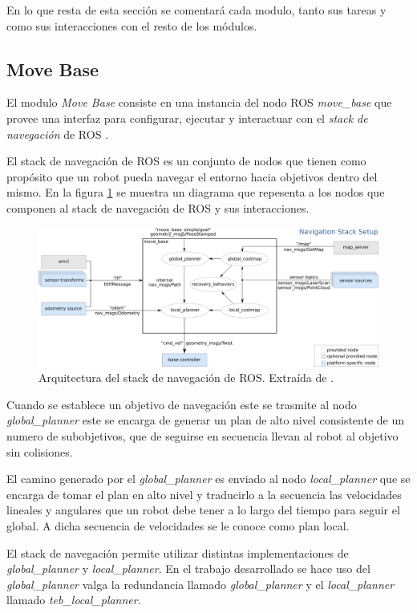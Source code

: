 En lo que resta de esta sección se comentará cada modulo, tanto sus tareas y como sus interacciones con el resto de los módulos.

\subsection{Move Base}
El modulo \emph{Move Base} consiste en una instancia del nodo ROS
\emph{move\_base} \cite{ROS-move_base} que provee una interfaz para configurar,
ejecutar y interactuar con el \emph{stack de navegación} de ROS
\cite{ROS-navigation}. 

El stack de navegación de ROS es un conjunto de nodos que tienen como propósito
que un robot pueda navegar el entorno hacia objetivos dentro del mismo. En la
figura \ref{fig:move_base} se muestra un diagrama que repesenta a los nodos que
componen al stack de navegación de ROS y sus interacciones.

\begin{figure}[H]
  \center
  \includegraphics[width=1\linewidth]{imagenes/move_base.png}
  \caption[Arquitectura del stack de navegación de ROS.]{Arquitectura del stack de navegación de ROS. Extraída de \cite{ROS-move_base}.}
  \label{fig:move_base}
\end{figure} 

Cuando se establece un objetivo de navegación este se trasmite al nodo
\emph{global\_planner} este se encarga de generar un plan de alto nivel
consistente de un numero de subobjetivos, que de seguirse en secuencia llevan
al robot al objetivo sin colisiones.

El camino generado por el \emph{global\_planner} es enviado al nodo
\emph{local\_planner} que se encarga de tomar el plan en alto nivel y
traducirlo a la secuencia las velocidades lineales y angulares que un robot
debe tener a lo largo del tiempo para seguir el global. A dicha secuencia de
velocidades se le conoce como plan local.

El stack de navegación permite utilizar distintas implementaciones de
\emph{global\_planner} y \emph{local\_planner}. En el trabajo desarrollado se
hace uso del \emph{global\_planner}\cite{ROS-global_planner} valga la
redundancia llamado \emph{global\_planner} y el \emph{local\_planner} llamado
\emph{teb\_local\_planner}\cite{ROS-teb_local_planner}.

